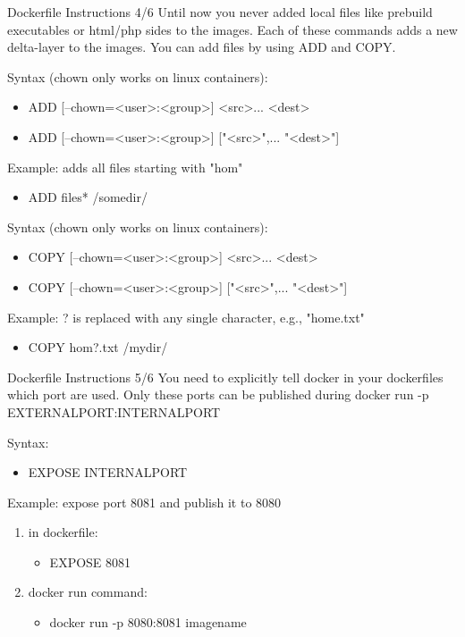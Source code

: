 \documentclass[10pt,aspectratio=\ratio,
compress
]{beamer}
\begin{document}
\begin{frame}{Dockerfile Instructions 4/6}
Until now you never added local files like prebuild executables or html/php sides to the images.
Each of these commands adds a new delta-layer to the images.
You can add files by using ADD and COPY.

Syntax (chown only works on linux containers):
\begin{itemize}
	\item ADD [--chown=<user>:<group>] <src>... <dest>
	\item ADD [--chown=<user>:<group>] ["<src>",... "<dest>"] 
\end{itemize}
Example: adds all files starting with "hom"
\begin{itemize}
	\item ADD files* /somedir/
\end{itemize}

Syntax (chown only works on linux containers):
\begin{itemize}
	\item COPY [--chown=<user>:<group>] <src>... <dest>
	\item COPY [--chown=<user>:<group>] ["<src>",... "<dest>"]
\end{itemize}
Example: ? is replaced with any single character, e.g., "home.txt"
\begin{itemize}
	\item COPY hom?.txt /mydir/
\end{itemize}

\end{frame}
\begin{frame}{Dockerfile Instructions 5/6}
You need to explicitly tell docker in your dockerfiles which port are used.
Only these ports can be published during docker run -p EXTERNALPORT:INTERNALPORT

Syntax:
\begin{itemize}
	\item EXPOSE INTERNALPORT
\end{itemize}

Example: expose port 8081 and publish it to 8080
\begin{enumerate}
\item in dockerfile:
\begin{itemize}
	\item EXPOSE 8081
\end{itemize}
\item docker run command:
\begin{itemize}
	\item docker run -p 8080:8081 imagename
\end{itemize}
\end{enumerate}

\end{frame}
\end{document}
